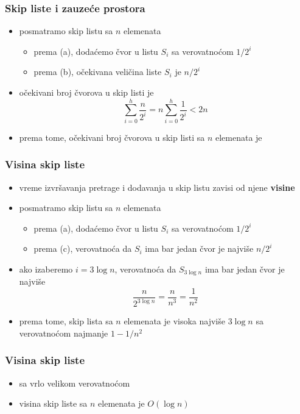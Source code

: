 \documentclass[compress]{beamer}
\begin{document}
\begin{frame}[fragile]
  \frametitle{Skip liste i zauzeće prostora}
  \begin{itemize}
    \item posmatramo skip listu sa $n$ elemenata
    \begin{itemize}
      \item prema (a), dodaćemo čvor u listu $S_i$ sa verovatnoćom $1/2^i$
      \item prema (b), očekivana veličina liste $S_i$ je $n/2^i$
    \end{itemize}
    \item očekivani broj čvorova u skip listi je
    $$ \sum_{i=0}^h \frac{n}{2^i} = n \sum_{i=0}^h \frac{1}{2^i} < 2n$$
    \item prema tome, očekivani broj čvorova u skip listi sa $n$ elemenata je 
  \end{itemize}
\end{frame}

\begin{frame}[fragile]
  \frametitle{Visina skip liste}
  \begin{itemize}
    \item vreme izvršavanja pretrage i dodavanja u skip listu zavisi od njene \textbf{visine}
    \item posmatramo skip listu sa $n$ elemenata
    \begin{itemize}
      \item prema (a), dodaćemo čvor u listu $S_i$ sa verovatnoćom $1/2^i$
      \item prema (c), verovatnoća da $S_i$ ima bar jedan čvor je najviše $n/2^i$
    \end{itemize}
    \item ako izaberemo $i=3\log n$, verovatnoća da $S_{3\log n}$ ima bar jedan čvor je najviše
    $$\frac{n}{2^{3\log n}} = \frac{n}{n^3} = \frac{1}{n^2}$$
    \item prema tome, skip lista sa $n$ elemenata je visoka najviše $3\log n$ sa verovatnoćom najmanje $1-1/n^2$
  \end{itemize}
\end{frame}

\begin{frame}[fragile]
  \frametitle{Visina skip liste}
  \begin{itemize}
    \item sa vrlo velikom verovatnoćom
    \item visina skip liste sa $n$ elemenata je $O(\log n)$
  \end{itemize}
\end{frame}
\end{document}
